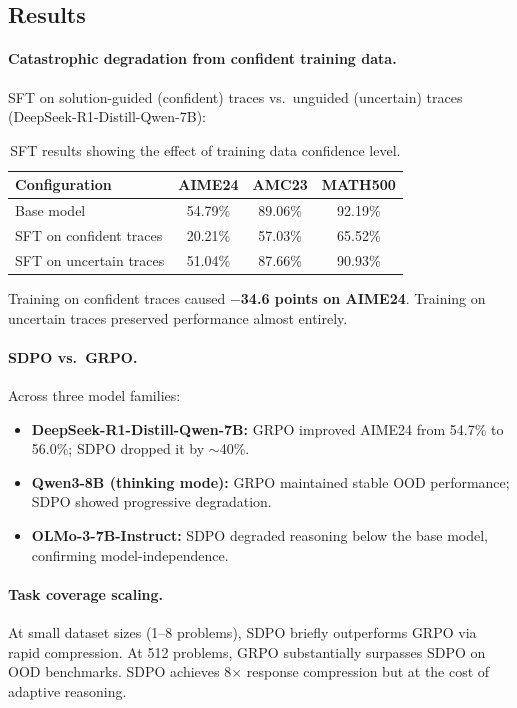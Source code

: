 \documentclass[11pt]{article}
\begin{document}
\subsection{Results}

\paragraph{Catastrophic degradation from confident training data.}
SFT on solution-guided (confident) traces vs.\ unguided (uncertain) traces (DeepSeek-R1-Distill-Qwen-7B):

\begin{table}[h]
\centering
\caption{SFT results showing the effect of training data confidence level.}
\begin{tabular}{lccc}
\toprule
\textbf{Configuration} & \textbf{AIME24} & \textbf{AMC23} & \textbf{MATH500} \\
\midrule
Base model & 54.79\% & 89.06\% & 92.19\% \\
SFT on confident traces & 20.21\% & 57.03\% & 65.52\% \\
SFT on uncertain traces & 51.04\% & 87.66\% & 90.93\% \\
\bottomrule
\end{tabular}
\end{table}

Training on confident traces caused \textbf{$-$34.6 points on AIME24}. Training on uncertain traces preserved performance almost entirely.

\paragraph{SDPO vs.\ GRPO.}
Across three model families:
\begin{itemize}
    \item \textbf{DeepSeek-R1-Distill-Qwen-7B:} GRPO improved AIME24 from 54.7\% to 56.0\%; SDPO dropped it by $\sim$40\%.
    \item \textbf{Qwen3-8B (thinking mode):} GRPO maintained stable OOD performance; SDPO showed progressive degradation.
    \item \textbf{OLMo-3-7B-Instruct:} SDPO degraded reasoning below the base model, confirming model-independence.
\end{itemize}

\paragraph{Task coverage scaling.}
At small dataset sizes (1--8 problems), SDPO briefly outperforms GRPO via rapid compression. At 512 problems, GRPO substantially surpasses SDPO on OOD benchmarks. SDPO achieves 8$\times$ response compression but at the cost of adaptive reasoning.
\end{document}
